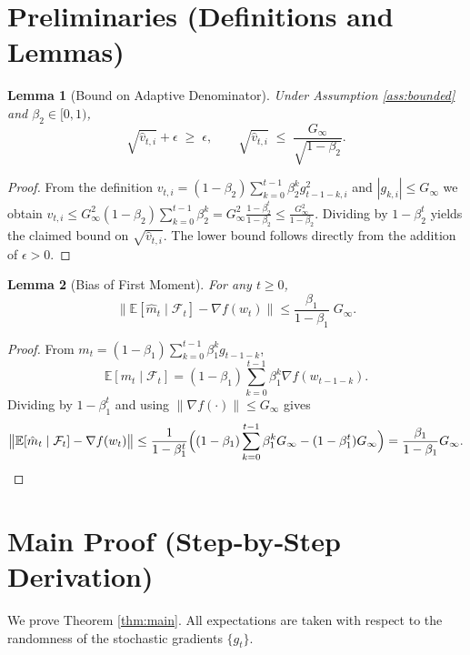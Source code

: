\documentclass{article}
\newtheorem{lemma}{Lemma}
\newcommand{\E}{\mathbb{E}}
\begin{document}
\section*{Preliminaries (Definitions and Lemmas)}
\begin{lemma}[Bound on Adaptive Denominator]\label{lem:denom}
Under Assumption \ref{ass:bounded} and $\beta_{2}\in[0,1)$,
\[
\sqrt{\hat v_{t,i}}+\epsilon \;\ge\; \epsilon,\qquad
\sqrt{\hat v_{t,i}} \;\le\; \frac{G_{\infty}}{\sqrt{1-\beta_{2}}}.
\]
\end{lemma}
\begin{proof}
From the definition $v_{t,i}= (1-\beta_{2})\sum_{k=0}^{t-1}\beta_{2}^{k}g_{t-1-k,i}^{2}$
and $|g_{k,i}|\le G_{\infty}$ we obtain $v_{t,i}\le G_{\infty}^{2}(1-\beta_{2})\sum_{k=0}^{t-1}\beta_{2}^{k}
=G_{\infty}^{2}\frac{1-\beta_{2}^{t}}{1-\beta_{2}}\le \frac{G_{\infty}^{2}}{1-\beta_{2}}$.
Dividing by $1-\beta_{2}^{t}$ yields the claimed bound on $\sqrt{\hat v_{t,i}}$.
The lower bound follows directly from the addition of $\epsilon>0$.
\end{proof}

\begin{lemma}[Bias of First Moment]\label{lem:bias-m}
For any $t\ge0$,
\[
\bigl\|\E[\hat m_{t}\mid\mathcal{F}_{t}] - \nabla f(w_{t})\bigr\|
\le \frac{\beta_{1}}{1-\beta_{1}}\;G_{\infty}.
\]
\end{lemma}
\begin{proof}
From $m_{t}= (1-\beta_{1})\sum_{k=0}^{t-1}\beta_{1}^{k}g_{t-1-k}$,
\[
\E[m_{t}\mid\mathcal{F}_{t}]
   =(1-\beta_{1})\sum_{k=0}^{t-1}\beta_{1}^{k}\nabla f(w_{t-1-k}).
\]
Dividing by $1-\beta_{1}^{t}$ and using $\|\nabla f(\cdot)\|\le G_{\infty}$ gives
\[
\bigl\|\E[\hat m_{t}\mid\mathcal{F}_{t}] - \nabla f(w_{t})\bigr\|
 \le \frac{1}{1-\beta_{1}^{t}}\Bigl((1-\beta_{1})\sum_{k=0}^{t-1}\beta_{1}^{k}G_{\infty}
          - (1-\beta_{1}^{t})G_{\infty}\Bigr)
 =\frac{\beta_{1}}{1-\beta_{1}}G_{\infty}.
\]
\end{proof}

\section*{Main Proof (Step‑by‑Step Derivation)}
We prove Theorem \ref{thm:main}.  
All expectations are taken with respect to the randomness of the stochastic gradients $\{g_{t}\}$.
\end{document}
